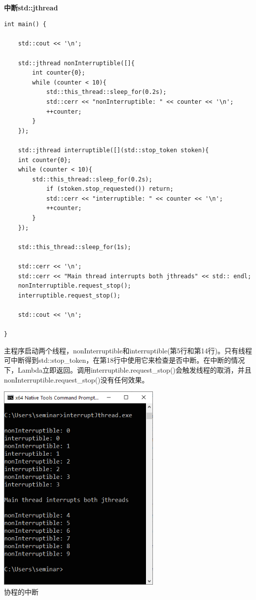 \hspace*{\fill} \\ %
\noindent
\textbf{中断std::jthread}
\begin{lstlisting}[style=styleCXX]
int main() {
	
	std::cout << '\n';
	
	std::jthread nonInterruptible([]{
		int counter{0};
		while (counter < 10){
			std::this_thread::sleep_for(0.2s);
			std::cerr << "nonInterruptible: " << counter << '\n';
			++counter;
		}
	});
	
	std::jthread interruptible([](std::stop_token stoken){
	int counter{0};
	while (counter < 10){
		std::this_thread::sleep_for(0.2s);
			if (stoken.stop_requested()) return;
			std::cerr << "interruptible: " << counter << '\n';
			++counter;
		}
	});
	
	std::this_thread::sleep_for(1s);
	
	std::cerr << '\n';
	std::cerr << "Main thread interrupts both jthreads" << std:: endl;
	nonInterruptible.request_stop();
	interruptible.request_stop();
	
	std::cout << '\n';
	
}
\end{lstlisting}

主程序启动两个线程，nonInterruptible和interruptible(第5行和第14行)。只有线程可中断得到std::stop\_token，在第18行中使用它来检查是否中断。在中断的情况下，Lambda立即返回。调用interruptible.request\_stop()会触发线程的取消，并且nonInterruptible.request\_stop()没有任何效果。

\begin{center}
\includegraphics[width=0.6\textwidth]{content/2/chapter3/images/8.png}\\
协程的中断
\end{center}

